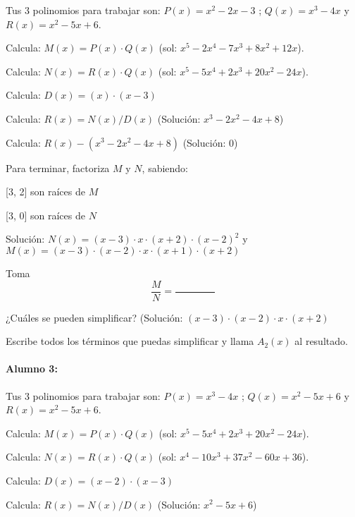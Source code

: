 Tus 3 polinomios para trabajar son: $P(x) =  x^2 - 2x - 3 $ ; $Q(x) =  x^3 - 4x $ y $R(x) =  x^2 - 5x + 6 $.



Calcula: $M(x) = P(x)\cdot  Q(x)$ (sol: $ x^5 - 2x^4 - 7x^3 + 8x^2 + 12x $).

Calcula: $N(x) = R(x)\cdot  Q(x)$ (sol: $ x^5 - 5x^4 + 2x^3 + 20x^2 - 24x $).

Calcula: $D(x) = ( x )\cdot  ( x - 3 )$

Calcula: $R(x) = N(x) / D(x)$ (Solución: $ x^3 - 2x^2 - 4x + 8 $)

Calcula: $R(x) - ( x^3 - 2x^2 - 4x + 8 )$ (Solución: $ 0 $)

Para terminar, factoriza $M$ y $N$, sabiendo:

     [3, 2]  son raíces de $M$

     [3, 0]  son raíces de $N$

Solución: $N(x) =  (x - 3) \cdot  x \cdot  (x + 2) \cdot  (x - 2)^2 $ y $M(x) =  (x - 3) \cdot  (x - 2) \cdot  x \cdot  (x + 1) \cdot  (x + 2) $

Toma \[\frac{M}{N} = \frac{\quad\quad\quad\quad}{\quad\quad\quad\quad}\]

¿Cuáles se pueden simplificar? (Solución: $ (x - 3) \cdot  (x - 2) \cdot  x \cdot  (x + 2) $

Escribe todos los términos que puedas simplificar y llama $A_2(x)$ al resultado.













\paragraph{Alumno 3:\\}



Tus 3 polinomios para trabajar son: $P(x) =  x^3 - 4x $ ; $Q(x) =  x^2 - 5x + 6 $ y $R(x) =  x^2 - 5x + 6 $.



Calcula: $M(x) = P(x)\cdot  Q(x)$ (sol: $ x^5 - 5x^4 + 2x^3 + 20x^2 - 24x $).

Calcula: $N(x) = R(x)\cdot  Q(x)$ (sol: $ x^4 - 10x^3 + 37x^2 - 60x + 36 $).

Calcula: $D(x) = ( x - 2 )\cdot  ( x - 3 )$

Calcula: $R(x) = N(x) / D(x)$ (Solución: $ x^2 - 5x + 6 $)

